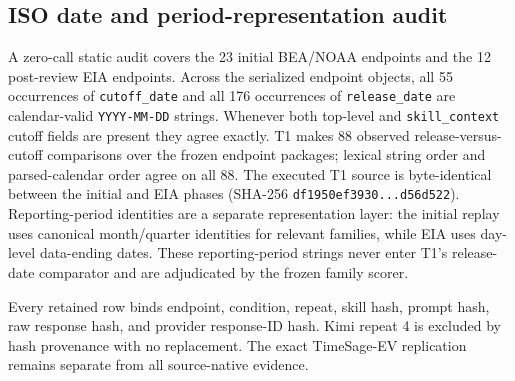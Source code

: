 \subsection{ISO date and period-representation audit}
A zero-call static audit covers the 23 initial BEA/NOAA endpoints and the 12 post-review EIA endpoints. Across the serialized endpoint objects, all 55 occurrences of \texttt{cutoff\_date} and all 176 occurrences of \texttt{release\_date} are calendar-valid \texttt{YYYY-MM-DD} strings. Whenever both top-level and \texttt{skill\_context} cutoff fields are present they agree exactly. T1 makes 88 observed release-versus-cutoff comparisons over the frozen endpoint packages; lexical string order and parsed-calendar order agree on all 88. The executed T1 source is byte-identical between the initial and EIA phases (SHA-256 \texttt{df1950ef3930...d56d522}). Reporting-period identities are a separate representation layer: the initial replay uses canonical month/quarter identities for relevant families, while EIA uses day-level data-ending dates. These reporting-period strings never enter T1's release-date comparator and are adjudicated by the frozen family scorer.

Every retained row binds endpoint, condition, repeat, skill hash, prompt hash, raw response hash, and provider response-ID hash. Kimi repeat 4 is excluded by hash provenance with no replacement. The exact TimeSage-EV replication remains separate from all source-native evidence.
